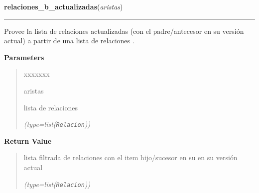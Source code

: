 \hspace{.8\funcindent}\begin{boxedminipage}{\funcwidth}

    \raggedright \textbf{relaciones\_b\_actualizadas}(\textit{aristas})

    \vspace{-1.5ex}

    \rule{\textwidth}{0.5\fboxrule}
\setlength{\parskip}{2ex}
    Provee la lista de relaciones actualizadas (con el padre/antecesor en 
    su versión actual) a partir de una lista de relaciones .

\setlength{\parskip}{1ex}
      \textbf{Parameters}
      \vspace{-1ex}

      \begin{quote}
        \begin{Ventry}{xxxxxxx}

          \item[aristas]

          lista de relaciones

            {\it (type=list(\texttt{Relacion}))}

        \end{Ventry}

      \end{quote}

      \textbf{Return Value}
    \vspace{-1ex}

      \begin{quote}
      lista filtrada de relaciones con el item hijo/sucesor en su en su 
      versión actual

      {\it (type=list(\texttt{Relacion}))}

      \end{quote}

    \end{boxedminipage}

    \label{saip:lib:func:relaciones_a_recuperar}

    \vspace{0.5ex}

